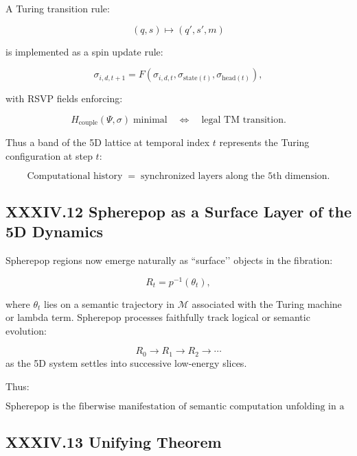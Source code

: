 \documentclass[11pt,letterpaper]{article}
\begin{document}
A Turing transition rule:

\[
(q, s) \mapsto (q', s', m)
\]

is implemented as a spin update rule:

\[
\sigma_{i,d,t+1} = F(\sigma_{i,d,t}, \sigma_{\text{state}(t)}, \sigma_{\text{head}(t)}),
\]

with RSVP fields enforcing:

\[
H_{\text{couple}}(\Psi, \sigma) 
\; \text{minimal} 
\quad\Longleftrightarrow\quad
\text{legal TM transition}.
\]

Thus a band of the 5D lattice at temporal index $t$ represents the Turing configuration at step $t$:

\[
\boxed{
\text{Computational history} \;=\; \text{synchronized layers along the 5th dimension}.
}
\]

\subsection{XXXIV.12 Spherepop as a Surface Layer of the 5D Dynamics}

Spherepop regions now emerge naturally as ``surface’’ objects in the fibration:

\[
R_t = p^{-1}(\theta_t),
\]

where $\theta_t$ lies on a semantic trajectory in $\mathcal{M}$ associated with the Turing machine or lambda term. Spherepop processes faithfully track logical or semantic evolution:

\[
R_0 \to R_1 \to R_2 \to \cdots
\]
as the 5D system settles into successive low-energy slices.

Thus:

\[
\boxed{
\text{Spherepop is the fiberwise manifestation of semantic computation
unfolding in a higher-dimensional RSVP–Ising manifold.}
}
\]

\subsection{XXXIV.13 Unifying Theorem}
\end{document}
